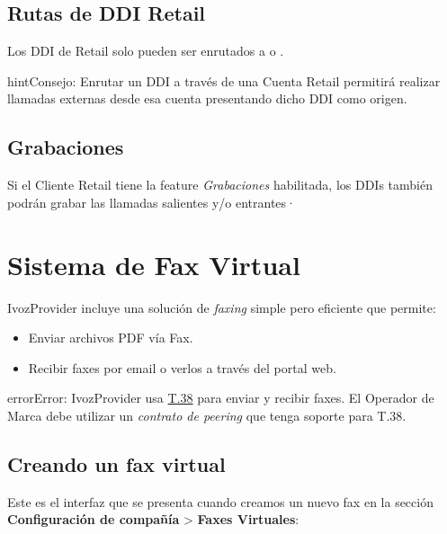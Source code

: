 \documentclass[letterpaper,10pt,spanish]{sphinxmanual}
\begin{document}
\subsection{Rutas de DDI Retail}
\label{retail/retail_ddis:retail-ddi-routes}
Los DDI de Retail solo pueden ser enrutados a {\hyperref[retail/retail_accounts:retail\string-accounts]{}} o {\hyperref[faxing/index:faxing\string-system]{}}.

\begin{notice}{hint}{Consejo:}
Enrutar un DDI a través de una Cuenta Retail permitirá realizar llamadas externas desde esa cuenta presentando dicho DDI como origen.
\end{notice}


\subsection{Grabaciones}
\label{retail/retail_ddis:recordings}
Si el Cliente Retail tiene la feature \emph{Grabaciones} habilitada, los DDIs también podrán grabar las llamadas salientes y/o entrantes·


\section{Sistema de Fax Virtual}
\label{faxing/index:virtual-fax-system}\label{faxing/index::doc}\label{faxing/index:faxing-system}
IvozProvider incluye una solución de \emph{faxing} simple pero eficiente que permite:
\begin{itemize}
\item {} 
Enviar archivos PDF vía Fax.

\item {} 
Recibir faxes por email o verlos a través del portal web.

\end{itemize}

\begin{notice}{error}{Error:}
IvozProvider usa \href{http://www.voip-info.org/wiki/view/T.38}{T.38} para enviar y recibir faxes. El Operador de Marca debe utilizar un \emph{contrato  de peering} que tenga soporte para T.38.
\end{notice}


\subsection{Creando un fax virtual}
\label{faxing/index:creating-a-virtual-fax}
Este es el interfaz que se presenta cuando creamos un nuevo fax en la sección \textbf{Configuración de compañía} \textgreater{} \textbf{Faxes Virtuales}:
\end{document}
